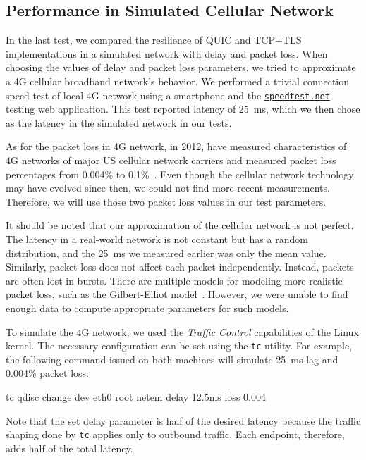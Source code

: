 \subsection{Performance in Simulated Cellular Network}

In the last test, we compared the resilience of QUIC and TCP+TLS implementations in a simulated
network with delay and packet loss. When choosing the values of delay and packet loss parameters, we
tried to approximate a 4G cellular broadband network's behavior. We performed a trivial connection
speed test of local 4G network using a smartphone and the
\href{https://speedtest.net}{\texttt{speedtest.net}} testing web application. This test reported
latency of \SI{25}{\milli\second}, which we then chose as the latency in the simulated network in
our tests.

As for the packet loss in 4G network, in 2012, \citeauthor{measuring4G} have measured
characteristics of 4G networks of major US cellular network carriers and measured packet loss
percentages from 0.004\% to 0.1\%~\cite{measuring4G}. Even though the cellular network technology
may have evolved since then, we could not find more recent measurements. Therefore, we will use
those two packet loss values in our test parameters.

It should be noted that our approximation of the cellular network is not perfect. The latency in a
real-world network is not constant but has a random distribution, and the \SI{25}{\milli\second} we
measured earlier was only the mean value. Similarly, packet loss does not affect each packet
independently. Instead, packets are often lost in bursts. There are multiple models for modeling
more realistic packet loss, such as the Gilbert-Elliot model~\cite{wiki:burst-error}. However, we
were unable to find enough data to compute appropriate parameters for such models.

To simulate the 4G network, we used the \textit{Traffic Control} capabilities of the Linux kernel.
The necessary configuration can be set using the \texttt{tc} utility. For example, the following
command issued on both machines will simulate \SI{25}{\milli\second} lag and 0.004\% packet loss:

\begin{myVerbatim}
tc qdisc change dev eth0 root netem delay 12.5ms loss 0.004%
\end{myVerbatim}

Note that the set delay parameter is half of the desired latency because the traffic shaping done by
\texttt{tc} applies only to outbound traffic. Each endpoint, therefore, adds half of the total
latency.

